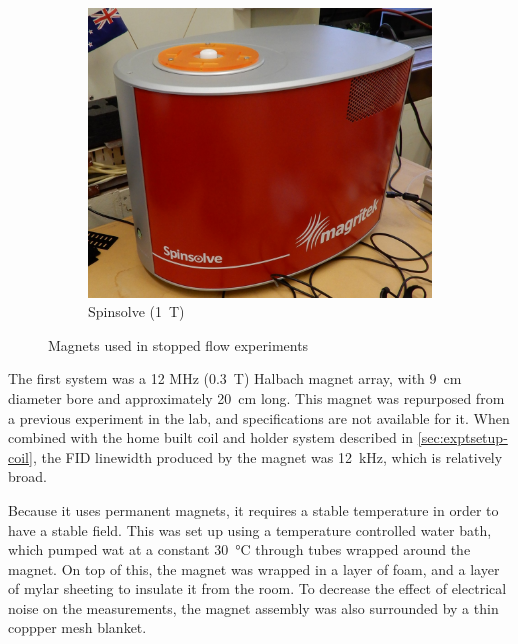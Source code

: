 \begin{figure}[t]
\begin{subfigure}[t]{0.4\textwidth}
\includegraphics[width=\textwidth]{figures/exptsetup/spinsolve.jpg}
\caption{Spinsolve (\SI{1}{T})}
\label{fig:exptsetup-spinsolve}
\end{subfigure}
\caption{Magnets used in stopped flow experiments}
\end{figure}


The first system was a 12 MHz (\SI{0.3}{T}) Halbach magnet array, with \SI{9}{cm} diameter bore and approximately \SI{20}{\centi\metre} long.
This magnet was repurposed from a previous experiment in the lab, and specifications are not available for it.
When combined with the home built coil and holder system described in \autoref{sec:exptsetup-coil}, the FID linewidth produced by the magnet was \SI{12}{\kilo\hertz}, which is relatively broad.

Because it uses permanent magnets, it requires a stable temperature in order to have a stable field.
This was set up using a temperature controlled water bath, which pumped wat at a constant \SI{30}{\celsius} through tubes wrapped around the magnet.
On top of this, the magnet was wrapped in a layer of foam, and a layer of mylar sheeting to insulate it from the room.
To decrease the effect of electrical noise on the measurements, the magnet assembly was also surrounded by a thin coppper mesh blanket.

